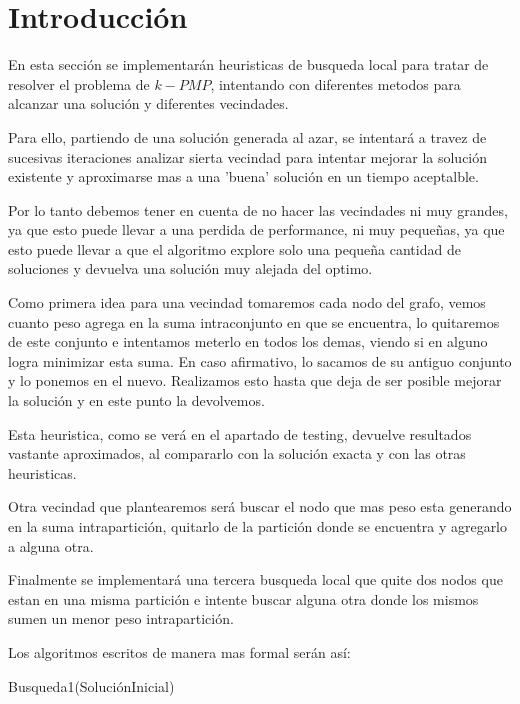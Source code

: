 \section{Introducci\'on}

En esta sección se implementarán heuristicas de busqueda local para tratar de resolver el problema de $k-PMP$, intentando con diferentes metodos para alcanzar una solución y diferentes vecindades.

Para ello, partiendo de una solución generada al azar, se intentará a travez de sucesivas iteraciones analizar sierta vecindad para intentar mejorar la solución existente y aproximarse mas a una 'buena' solución en un tiempo aceptalble. 

Por lo tanto debemos tener en cuenta de no hacer las vecindades ni muy grandes, ya que esto puede llevar a una perdida de performance, ni muy pequeñas, ya que esto puede llevar a que el algoritmo explore solo una pequeña cantidad de soluciones y devuelva una solución muy alejada del optimo.

Como primera idea para una vecindad tomaremos cada nodo del grafo, vemos cuanto peso agrega en la suma intraconjunto en que se encuentra, lo quitaremos de este conjunto e intentamos meterlo en todos los demas, viendo si en alguno logra minimizar esta suma. En caso afirmativo, lo sacamos de su antiguo conjunto y lo ponemos en el nuevo. Realizamos esto hasta que deja de ser posible mejorar la solución y en este punto la devolvemos.

Esta heuristica, como se verá en el apartado de testing, devuelve resultados vastante aproximados, al compararlo con la solución exacta y con las otras heuristicas.

Otra vecindad que plantearemos será buscar el nodo que mas peso esta generando en la suma intrapartición, quitarlo de la partición donde se encuentra y agregarlo a alguna otra.

Finalmente se implementará una tercera busqueda local que quite dos nodos que estan en una misma partición e intente buscar alguna otra donde los mismos sumen un menor peso intrapartición.

Los algoritmos escritos de manera mas formal serán así:

\begin{algorithm}
  	\begin{algorithmic}[1]\parskip=1mm
		 \caption{ Busqueda1(SoluciónInicial) }
	\end{algorithmic}
\end{algorithm}

